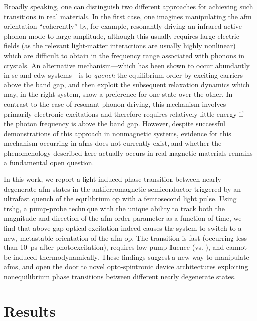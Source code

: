 Broadly speaking, one can distinguish two different approaches for achieving such transitions in real materials.
In the first case, one imagines manipulating the \gls{afm} orientation ``coherently'' by, for example, resonantly driving an infrared-active phonon mode to large amplitude, although this usually requires large electric fields (as the relevant light-matter interactions are usually highly nonlinear\citep{afanasiev_ultrafast_2021}) which are difficult to obtain in the frequency range associated with phonons in crystals.
An alternative mechanism---which has been shown to occur abundantly in \gls{sc}\citep{fausti_light-induced_2011} and \gls{cdw}\citep{kogar_light-induced_2020} systems---is to \textit{quench} the equilibrium order by exciting carriers above the band gap, and then exploit the subsequent relaxation dynamics which may, in the right system, show a preference for one state over the other\citep{sun_transient_2020}.
In contrast to the case of resonant phonon driving, this mechanism involves primarily electronic excitations and therefore requires relatively little energy if the photon frequency is above the band gap.
However, despite successful demonstrations of this approach in nonmagnetic systems\citep{fausti_light-induced_2011,kogar_light-induced_2020}, evidence for this mechanism occurring in \glspl{afm} does not currently exist, and whether the phenomenology described here actually occurs in real magnetic materials remains a fundamental open question.

In this work, we report a light-induced phase transition between nearly degenerate \gls{afm} states in the antiferromagnetic semiconductor \cmb \citep{gibson_magnetic_2015} triggered by an ultrafast quench of the equilibrium \gls{op} with a femtosecond light pulse.
Using \gls{trshg}, a pump-probe technique with the unique ability to track both the magnitude and direction of the \gls{afm} order parameter as a function of time, we find that above-gap optical excitation indeed causes the system to switch to a new, metastable orientation of the \gls{afm} \gls{op}.
The transition is fast (occurring less than \qty{10}{ps} after photoexcitation), requires low pump fluence (\threshold vs. \previousthreshold\citep{afanasiev_ultrafast_2021}), and cannot be induced thermodynamically.
These findings suggest a new way to manipulate \glspl{afm}, and open the door to novel opto-spintronic device architectures exploiting nonequilibrium phase transitions between different nearly degenerate states. 

\section{Results}

